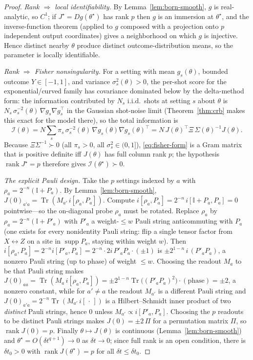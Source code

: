 \documentclass[aps,prxquantum,reprint,superscriptaddress,nofootinbib,amsmath,amssymb]{revtex4-2}
\newcommand{\Tr}{\operatorname{Tr}}
\newcommand{\supp}{\operatorname{supp}}
\newcommand{\id}{\mathbb{I}}
\newcommand{\dt}{\delta t}
\begin{document}
\begin{proof}
\emph{Rank $\Rightarrow$ local identifiability.} By Lemma~\ref{lem:born-smooth}, $g$ is real-analytic, so $C^1$; if $J^\star=Dg(\theta^\star)$ has rank $p$ then $g$ is an immersion at $\theta^\star$, and the inverse-function theorem (applied to $g$ composed with a projection onto $p$ independent output coordinates) gives a neighborhood on which $g$ is injective. Hence distinct nearby $\theta$ produce distinct outcome-distribution means, so the parameter is locally identifiable.

\emph{Rank $\Rightarrow$ Fisher nonsingularity.} For a setting with mean $g_s(\theta)$, bounded outcome $Y\in[-1,1]$, and variance $\sigma_s^2(\theta)>0$, the per-shot score for the exponential/curved family has covariance dominated below by the delta-method form: the information contributed by $N_s$ i.i.d.\ shots at setting $s$ about $\theta$ is $N_s\,\sigma_s^{-2}(\theta)\,\nabla g_s\nabla g_s^\top$ in the Gaussian shot-noise limit (Theorem~\ref{thm:crb} makes this exact for the model there), so the total information is
\begin{equation}
    \mathcal{I}(\theta)=N\sum_{s}\pi_s\,\sigma_s^{-2}(\theta)\,\nabla g_s(\theta)\nabla g_s(\theta)^\top=N\,J(\theta)^\top\Xi\,\Sigma(\theta)^{-1}J(\theta).
    \label{eq:fisher-form}
\end{equation}
Because $\Xi\Sigma^{-1}\succ0$ (all $\pi_s>0$, all $\sigma_s^2\in(0,1]$), \eqref{eq:fisher-form} is a Gram matrix that is positive definite iff $J(\theta)$ has full column rank $p$; the hypothesis $\operatorname{rank}J^\star=p$ therefore gives $\mathcal{I}(\theta^\star)\succ0$.

\emph{The explicit Pauli design.} Take the $p$ settings indexed by $a$ with $\rho_a=2^{-n}(\id+P_a)$. By Lemma~\ref{lem:born-smooth}, $J(0)_{a'a}=\Tr(M_{a'}\,i[\rho_a,P_a])$. Compute $i[\rho_a,P_a]=2^{-n}\,i[\id+P_a,P_a]=0$ pointwise---so the on-diagonal probe $\rho_a$ must be rotated. Replace $\rho_a$ by $\rho_a=2^{-n}(\id+P'_a)$ with $P'_a$ a weight-$\leq w$ Pauli string anticommuting with $P_a$ (one exists for every nonidentity Pauli string: flip a single tensor factor from $X\!\leftrightarrow\!Z$ on a site in $\supp P_a$, staying within weight $w$). Then $i[\rho_a,P_a]=2^{-n}i[P'_a,P_a]=2^{-n}\cdot2i\,P'_aP_a\cdot(\pm1)$ is $\pm2^{1-n}\,i\,(P'_aP_a)$, a nonzero Pauli string (up to phase) of weight $\leq w$. Choosing the readout $M_a$ to be that Pauli string makes $J(0)_{aa}=\Tr(M_a\,i[\rho_a,P_a])=\pm2^{1-n}\Tr\bigl((P'_aP_a)^2\bigr)\cdot(\text{phase})=\pm2$, a nonzero constant, while for $a'\neq a$ the readout $M_{a'}$ is a different Pauli string and $J(0)_{a'a}=2^{-n}\Tr(M_{a'}\,i[\,\cdot\,])$ is a Hilbert--Schmidt inner product of two \emph{distinct} Pauli strings, hence $0$ unless $M_{a'}\propto i[P'_a,P_a]$. Choosing the $p$ readouts to be distinct Pauli strings makes $J(0)=\pm2\,\Pi$ for a permutation matrix $\Pi$, so $\operatorname{rank}J(0)=p$. Finally $\theta\mapsto J(\theta)$ is continuous (Lemma~\ref{lem:born-smooth}) and $\theta^\star=O(\dt^{q+1})\to0$ as $\dt\to0$; since full rank is an open condition, there is $\dt_0>0$ with $\operatorname{rank}J(\theta^\star)=p$ for all $\dt\leq\dt_0$.
\end{proof}
\end{document}
